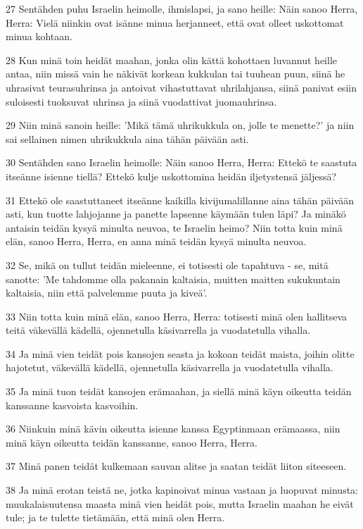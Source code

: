\par 27 Sentähden puhu Israelin heimolle, ihmislapsi, ja sano heille: Näin sanoo Herra, Herra: Vielä niinkin ovat isänne minua herjanneet, että ovat olleet uskottomat minua kohtaan.
\par 28 Kun minä toin heidät maahan, jonka olin kättä kohottaen luvannut heille antaa, niin missä vain he näkivät korkean kukkulan tai tuuhean puun, siinä he uhrasivat teurasuhrinsa ja antoivat vihastuttavat uhrilahjansa, siinä panivat esiin suloisesti tuoksuvat uhrinsa ja siinä vuodattivat juomauhrinsa.
\par 29 Niin minä sanoin heille: 'Mikä tämä uhrikukkula on, jolle te menette?' ja niin sai sellainen nimen uhrikukkula aina tähän päivään asti.
\par 30 Sentähden sano Israelin heimolle: Näin sanoo Herra, Herra: Ettekö te saastuta itseänne isienne tiellä? Ettekö kulje uskottomina heidän iljetystensä jäljessä?
\par 31 Ettekö ole saastuttaneet itseänne kaikilla kivijumalillanne aina tähän päivään asti, kun tuotte lahjojanne ja panette lapsenne käymään tulen läpi? Ja minäkö antaisin teidän kysyä minulta neuvoa, te Israelin heimo? Niin totta kuin minä elän, sanoo Herra, Herra, en anna minä teidän kysyä minulta neuvoa.
\par 32 Se, mikä on tullut teidän mieleenne, ei totisesti ole tapahtuva - se, mitä sanotte: 'Me tahdomme olla pakanain kaltaisia, muitten maitten sukukuntain kaltaisia, niin että palvelemme puuta ja kiveä'.
\par 33 Niin totta kuin minä elän, sanoo Herra, Herra: totisesti minä olen hallitseva teitä väkevällä kädellä, ojennetulla käsivarrella ja vuodatetulla vihalla.
\par 34 Ja minä vien teidät pois kansojen seasta ja kokoan teidät maista, joihin olitte hajotetut, väkevällä kädellä, ojennetulla käsivarrella ja vuodatetulla vihalla.
\par 35 Ja minä tuon teidät kansojen erämaahan, ja siellä minä käyn oikeutta teidän kanssanne kasvoista kasvoihin.
\par 36 Niinkuin minä kävin oikeutta isienne kanssa Egyptinmaan erämaassa, niin minä käyn oikeutta teidän kanssanne, sanoo Herra, Herra.
\par 37 Minä panen teidät kulkemaan sauvan alitse ja saatan teidät liiton siteeseen.
\par 38 Ja minä erotan teistä ne, jotka kapinoivat minua vastaan ja luopuvat minusta: muukalaisuutensa maasta minä vien heidät pois, mutta Israelin maahan he eivät tule; ja te tulette tietämään, että minä olen Herra.
